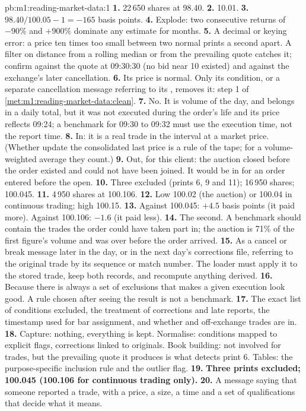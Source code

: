 \begin{solution}{pb:m1:reading-market-data:1}
\textbf{1.} 22\,650 shares at 98.40.
\textbf{2.} 10.01.
\textbf{3.} $98.40/100.05 - 1 = -165$ basis points.
\textbf{4.} Explode: two consecutive returns of $-90\%$ and $+900\%$ dominate
any estimate for months.
\textbf{5.} A decimal or keying error: a price ten times too small between
two normal prints a second apart. A filter on distance from a rolling median
or from the prevailing quote catches it; confirm against the quote at
09:30:30 (no bid near 10 existed) and against the exchange's later
cancellation.
\textbf{6.} Its price is normal. Only its condition, or a separate
cancellation message referring to its , removes it: step 1 of
\cref{met:m1:reading-market-data:clean}.
\textbf{7.} No. It is volume of the day, and belongs in a daily total, but it
was not executed during the order's life and its price reflects 09:24; a
benchmark for 09:30 to 09:32 must use the execution time, not the report
time.
\textbf{8.} In: it is a real trade in the interval at a market price.
(Whether  update the consolidated last price is a rule of the tape;
for a volume-weighted average they count.)
\textbf{9.} Out, for this client: the auction closed before the order existed
and could not have been joined. It would be in for an order entered before
the open.
\textbf{10.} Three excluded (prints 6, 9 and 11); 16\,950 shares; 100.045.
\textbf{11.} 4\,950 shares at 100.106.
\textbf{12.} Low 100.02 (the auction) or 100.04 in continuous trading; high
100.15.
\textbf{13.} Against 100.045: $+4.5$ basis points (it paid more). Against
100.106: $-1.6$ (it paid less).
\textbf{14.} The second. A benchmark should contain the trades the order
could have taken part in; the auction is 71\% of the first figure's volume
and was over before the order arrived.
\textbf{15.} As a cancel or break message later in the day, or in the next
day's corrections file, referring to the original trade by its sequence or
match number. The loader must apply it to the stored trade, keep both
records, and recompute anything derived.
\textbf{16.} Because there is always a set of exclusions that makes a given
execution look good. A rule chosen after seeing the result is not a
benchmark.
\textbf{17.} The exact list of conditions excluded, the treatment of
corrections and late reports, the timestamp used for bar assignment, and
whether  and off-exchange trades are in.
\textbf{18.} Capture: nothing, everything is kept. Normalise: conditions
mapped to explicit flags, corrections linked to originals. Book building:
not involved for trades, but the prevailing quote it produces is what
detects print 6. Tables: the purpose-specific inclusion rule and the outlier
flag.
\textbf{19.} \textbf{Three prints excluded; 100.045 (100.106 for continuous
trading only).}
\textbf{20.} A message saying that someone reported a trade, with a price, a
size, a time and a set of qualifications that decide what it means.
\end{solution}

